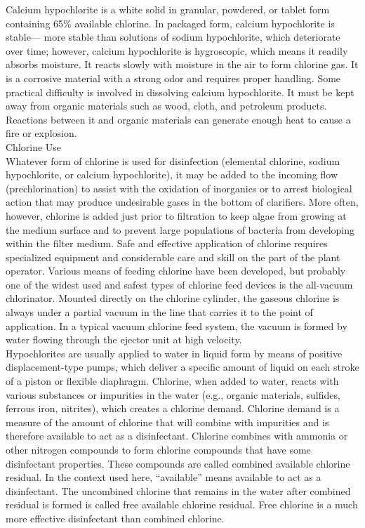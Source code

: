 Calcium hypochlorite is a white solid in granular, powdered, or tablet form containing 65\% available chlorine. In packaged form, calcium hypochlorite is stable— more stable than solutions of sodium hypochlorite, which deteriorate over time; however, calcium hypochlorite is hygroscopic, which means it readily absorbs moisture. It reacts slowly with moisture in the air to form chlorine gas. It is a corrosive material with a strong odor and requires proper handling. Some practical difficulty is involved in dissolving calcium hypochlorite. It must be kept away from organic materials such as wood, cloth, and petroleum products. Reactions between it and organic materials can generate enough heat to cause a fire or explosion.\\

Chlorine Use\\
Whatever form of chlorine is used for disinfection (elemental chlorine, sodium hypochlorite, or calcium hypochlorite), it may be added to the incoming flow (prechlorination) to assist with the oxidation of inorganics or to arrest biological action that may produce undesirable gases in the bottom of clarifiers. More often, however, chlorine is added just prior to filtration to keep algae from growing at the medium surface and to prevent large populations of bacteria from developing within the filter medium. Safe and effective application of chlorine requires specialized equipment and considerable care and skill on the part of the plant operator. Various means of feeding chlorine have been developed, but probably one of the widest used and safest types of chlorine feed devices is the all-vacuum chlorinator. Mounted directly on the chlorine cylinder, the gaseous chlorine is always under a partial vacuum in the line that carries it to the point of application. In a typical vacuum chlorine feed system, the vacuum is formed by water flowing through the ejector unit at high velocity.\\
Hypochlorites are usually applied to water in liquid form by means of positive displacement-type pumps, which deliver a specific amount of liquid on each stroke of a piston or flexible diaphragm. Chlorine, when added to water, reacts with various substances or impurities in the water (e.g., organic materials, sulfides, ferrous iron, nitrites), which creates a chlorine demand. Chlorine demand is a measure of the amount of chlorine that will combine with impurities and is therefore available to act as a disinfectant. Chlorine combines with ammonia or other nitrogen compounds to form chlorine compounds that have some disinfectant properties. These compounds are called combined available chlorine residual. In the context used here, “available” means available to act as a disinfectant. The uncombined chlorine that remains in the water after combined residual is formed is called free available chlorine residual. Free chlorine is a much more effective disinfectant than combined chlorine.\\


